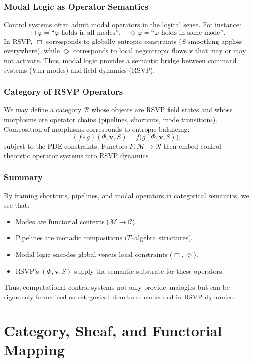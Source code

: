\documentclass[a4paper,11pt,openany]{book}
\begin{document}
\subsection{Modal Logic as Operator Semantics}

Control systems often admit modal operators in the logical sense. For instance:
\[
\Box \varphi = \text{``$\varphi$ holds in all modes''}, \quad 
\Diamond \varphi = \text{``$\varphi$ holds in some mode''}.
\]
In RSVP, $\Box$ corresponds to globally entropic constraints ($S$ smoothing applies 
everywhere), while $\Diamond$ corresponds to local negentropic flows $\mathbf{v}$ 
that may or may not activate. Thus, modal logic provides a semantic bridge between 
command systems (Vim modes) and field dynamics (RSVP).

\subsection{Category of RSVP Operators}

We may define a category $\mathcal{R}$ whose objects are RSVP field states and whose 
morphisms are operator chains (pipelines, shortcuts, mode transitions). Composition of 
morphisms corresponds to entropic balancing:
\[
(f \circ g)(\Phi,\mathbf{v},S) = f\big(g(\Phi,\mathbf{v},S)\big),
\]
subject to the PDE constraints. Functors $F: \mathcal{M} \to \mathcal{R}$ then embed 
control–theoretic operator systems into RSVP dynamics.

\subsection{Summary}

By framing shortcuts, pipelines, and modal operators in categorical semantics, we see that:
\begin{itemize}
  \item Modes are functorial contexts ($\mathcal{M}\to\mathcal{C}$).
  \item Pipelines are monadic compositions ($T$–algebra structures).
  \item Modal logic encodes global versus local constraints ($\Box,\Diamond$).
  \item RSVP’s $(\Phi,\mathbf{v},S)$ supply the semantic substrate for these operators.
\end{itemize}
Thus, computational control systems not only provide analogies but can be rigorously 
formalized as categorical structures embedded in RSVP dynamics.

\chapter{Category, Sheaf, and Functorial Mapping}
\end{document}
